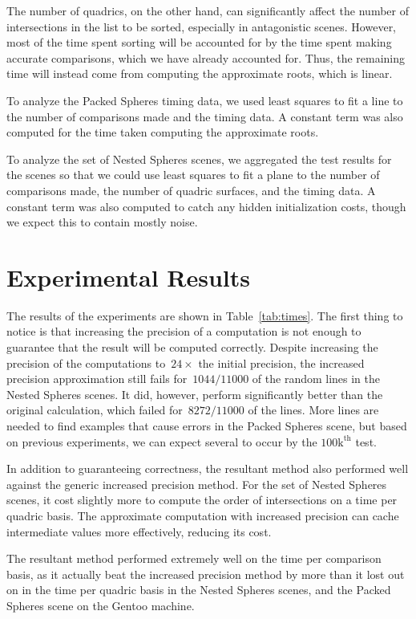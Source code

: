 \documentclass{cccg16}
\begin{document}
The number of quadrics, on the other hand, can significantly affect
the number of intersections in the list to be sorted, especially in
antagonistic scenes.  However, most of the time spent sorting will be
accounted for by the time spent making accurate comparisons, which we
have already accounted for.  Thus, the remaining time will instead
come from computing the approximate roots, which is linear.

To analyze the Packed Spheres timing data, we used least squares to
fit a line to the number of comparisons made and the timing data.  A
constant term was also computed for the time taken computing the
approximate roots.

To analyze the set of Nested Spheres scenes, we aggregated the test
results for the scenes so that we could use least squares to fit a
plane to the number of comparisons made, the number of quadric
surfaces, and the timing data.  A constant term was also computed to
catch any hidden initialization costs, though we expect this to
contain mostly noise.

\section{Experimental Results}
The results of the experiments are shown in Table~\ref{tab:times}.
The first thing to notice is that increasing the precision of a
computation is not enough to guarantee that the result will be
computed correctly.  Despite increasing the precision of the
computations to~$24\times$ the initial precision, the increased
precision approximation still fails for~$1044/11000$ of the random
lines in the Nested Spheres scenes.  It did, however, perform
significantly better than the original calculation, which failed
for~$8272/11000$ of the lines.  More lines are needed to find examples
that cause errors in the Packed Spheres scene, but based on previous
experiments, we can expect several to occur by the
$100\text{k}^\text{th}$ test.

In addition to guaranteeing correctness, the resultant method also performed
well against the generic increased precision method.  For the set of
Nested Spheres scenes, it cost slightly more to compute the order of
intersections on a time per quadric basis.  The approximate computation with increased precision can 
 cache intermediate values more effectively, reducing its cost.

The resultant method  performed extremely well on the time per
comparison basis, as it actually beat the increased precision method
by more than it lost out on in the time per quadric basis in the
Nested Spheres scenes, and the Packed Spheres scene on the Gentoo
machine.
\end{document}
